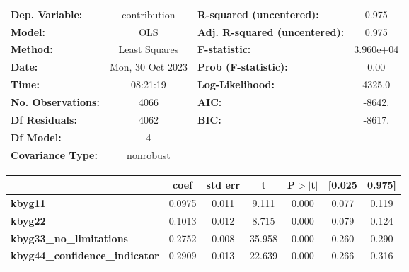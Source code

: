 \begin{center}
\begin{tabular}{lclc}
\toprule
\textbf{Dep. Variable:}                &   contribution   & \textbf{  R-squared (uncentered):}      &     0.975   \\
\textbf{Model:}                        &       OLS        & \textbf{  Adj. R-squared (uncentered):} &     0.975   \\
\textbf{Method:}                       &  Least Squares   & \textbf{  F-statistic:       }          & 3.960e+04   \\
\textbf{Date:}                         & Mon, 30 Oct 2023 & \textbf{  Prob (F-statistic):}          &     0.00    \\
\textbf{Time:}                         &     08:21:19     & \textbf{  Log-Likelihood:    }          &    4325.0   \\
\textbf{No. Observations:}             &        4066      & \textbf{  AIC:               }          &    -8642.   \\
\textbf{Df Residuals:}                 &        4062      & \textbf{  BIC:               }          &    -8617.   \\
\textbf{Df Model:}                     &           4      & \textbf{                     }          &             \\
\textbf{Covariance Type:}              &    nonrobust     & \textbf{                     }          &             \\
\bottomrule
\end{tabular}
\begin{tabular}{lcccccc}
                                       & \textbf{coef} & \textbf{std err} & \textbf{t} & \textbf{P$> |$t$|$} & \textbf{[0.025} & \textbf{0.975]}  \\
\midrule
\textbf{kbyg11}                        &       0.0975  &        0.011     &     9.111  &         0.000        &        0.077    &        0.119     \\
\textbf{kbyg22}                        &       0.1013  &        0.012     &     8.715  &         0.000        &        0.079    &        0.124     \\
\textbf{kbyg33\_no\_limitations}       &       0.2752  &        0.008     &    35.958  &         0.000        &        0.260    &        0.290     \\
\textbf{kbyg44\_confidence\_indicator} &       0.2909  &        0.013     &    22.639  &         0.000        &        0.266    &        0.316     \\

\end{tabular}
\end{center}
